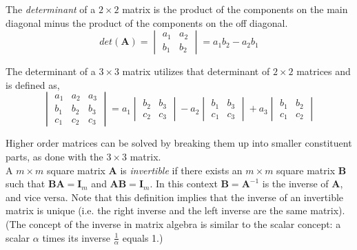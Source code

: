 \documentclass[12pt]{article}
\begin{document}
The \emph{determinant} of a $2\times2$ matrix is the product of the components on the main diagonal minus the product of the components on the off diagonal.
\[
det(\mathbf{A})=
\begin{vmatrix}
a_1 & a_2 \\
b_1 & b_2
\end{vmatrix}
= a_1 b_2 - a_2 b_1
\]

The determinant of a $3\times3$ matrix utilizes that determinant of $2\times2$ matrices and is defined as,
\[
\begin{vmatrix}
a_1 & a_2 & a_3\\
b_1 & b_2 & b_3 \\
c_1 & c_2 & c_3
\end{vmatrix}
=
a_1
\begin{vmatrix}
b_2 & b_3 \\
c_2 & c_3
\end{vmatrix}
- a_2
\begin{vmatrix}
b_1 & b_3 \\
c_1 & c_3
\end{vmatrix}
+ a_3
\begin{vmatrix}
b_1 & b_2 \\
c_1 & c_2
\end{vmatrix}
\]

Higher order matrices can be solved by breaking them up into smaller constituent parts, as done with the $3\times3$ matrix. \\

A $m\times m$ square matrix $\mathbf{A}$ is \emph{invertible} if there exists an $m\times m$ square matrix $\mathbf{B}$ such that $\mathbf{BA}=\mathbf{I}_m$ and $\mathbf{AB}=\mathbf{I}_m$. In this context $\mathbf{B}=\mathbf{A}^{-1}$ is the inverse of $\mathbf{A}$, and vice versa. Note that this definition implies that the inverse of an invertible matrix is unique (i.e. the right inverse and the left inverse are the same matrix). (The concept of the inverse in matrix algebra is similar to the scalar concept: a scalar $\alpha$ times its inverse $\frac{1}{\alpha}$ equals 1.)\\
\end{document}
